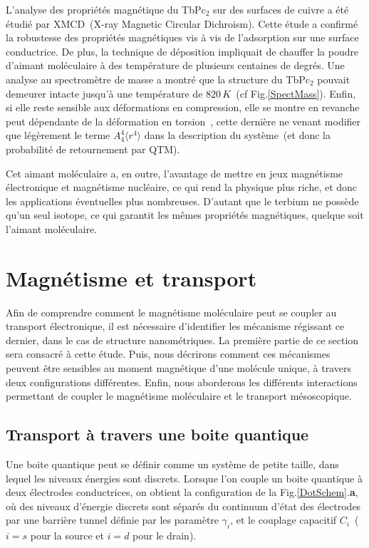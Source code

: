 L'analyse des propriétés magnétique du TbPc$_{2}$ sur des surfaces de cuivre a été étudié par XMCD~(X-ray Magnetic Circular Dichroism). Cette étude a confirmé la robustesse des propriétés magnétiques vis à vis de l'adsorption sur une surface conductrice. De plus, la technique de déposition impliquait de chauffer la poudre d'aimant moléculaire à des température de plusieurs centaines de degrés. Une analyse au spectromètre de masse a montré que la structure du TbPc$_{2}$ pouvait demeurer intacte jusqu'à une température de $820\,K$~(cf Fig.\ref{SpectMass}). Enfin, si elle reste sensible aux déformations en compression, elle se montre en revanche peut dépendante de la déformation en torsion~\cite{Sorace2011}, cette dernière ne venant modifier que légèrement le terme $A_4^4 \langle r^4 \rangle$ dans la description du système~(et donc la probabilité de retournement par QTM).

Cet aimant moléculaire a, en outre, l'avantage de mettre en jeux magnétisme électronique et magnétisme nucléaire, ce qui rend la physique plus riche, et donc les applications éventuelles plus nombreuses. D'autant que le terbium ne possède qu'un seul isotope, ce qui garantit les mêmes propriétés magnétiques, quelque soit l'aimant moléculaire.

\section{Magnétisme et transport}
Afin de comprendre comment le magnétisme moléculaire peut se coupler au transport électronique, il est nécessaire d'identifier les mécanisme régissant ce dernier, dans le cas de structure nanométriques. La première partie de ce section sera consacré à cette étude.
Puis, nous décrirons comment ces mécanismes peuvent \^etre sensibles au moment magnétique d'une molécule unique, à travers deux configurations différentes. Enfin, nous aborderons les différents interactions permettant de coupler le magnétisme moléculaire et le transport mésoscopique.

\subsection{Transport à travers une boite quantique}
Une boite quantique peut se définir comme un système de petite taille, dans lequel les niveaux énergies sont discrets. Lorsque l'on couple un boite quantique à deux électrodes conductrices, on obtient la configuration de la Fig.\ref{DotSchem}.\textbf{a}, où des niveaux d'énergie discrets sont séparés du continuum d'état des électrodes par une barrière tunnel définie par les paramètre $\gamma_i$, et le couplage capacitif $C_i$~($i=s$ pour la source et $i=d$ pour le drain).

